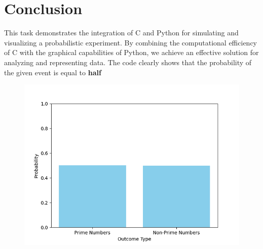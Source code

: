 \documentclass[journal]{IEEEtran}
\begin{document}
\section*{Conclusion}
This task demonstrates the integration of C and Python for simulating and visualizing a probabilistic experiment. By combining the computational efficiency of C with the graphical capabilities of Python, we achieve an effective solution for analyzing and representing data. The code clearly shows that the probability of the given event is equal to \textbf{half}
\begin{figure}[h!]
   \centering
   \includegraphics[width=\columnwidth]{figs/Figure_1.png}
\end{figure}
\end{document}
